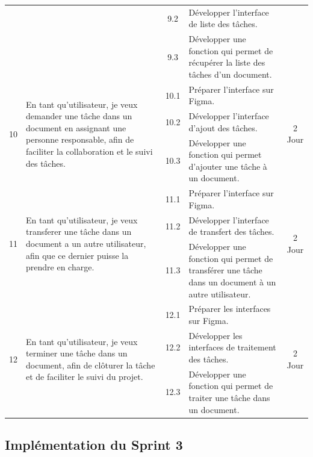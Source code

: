 \begin{adjustwidth}{-1cm}{}
\begin{longtable}{|c|p{6cm}|c|p{6cm}|c|}
      \cline{3-4}
      & & 9.2 & Développer l'interface de liste des tâches. & \\
      \cline{3-4}
      & & 9.3 & Développer une fonction qui permet de récupérer la liste des tâches d'un document. & \\
      \cline{1-5}
      \multirow{3}{*}{10} & \multirow{3}{6cm}{En tant qu'utilisateur, je veux demander une tâche dans un document en assignant une personne responsable, afin de faciliter la collaboration et le suivi des tâches.} & 10.1 & Préparer l'interface sur Figma. & \multirow{3}{*}{2 Jour} \\
      \cline{3-4}
      & & 10.2 & Développer l'interface d'ajout des tâches. & \\
      \cline{3-4}
      & & 10.3 & Développer une fonction qui permet d'ajouter une tâche à un document. & \\
      \cline{1-5}
      \multirow{3}{*}{11} & \multirow{3}{6cm}{En tant qu'utilisateur, je veux transferer une tâche dans un document a un autre utilisateur, afin que ce dernier puisse la prendre en charge.} & 11.1 & Préparer l'interface sur Figma. & \multirow{3}{*}{2 Jour} \\
      \cline{3-4}
      & & 11.2 & Développer l'interface de transfert des tâches. & \\
      \cline{3-4}
      & & 11.3 & Développer une fonction qui permet de transférer une tâche dans un document à un autre utilisateur. & \\
      \cline{1-5}
      \multirow{3}{*}{12} &\multirow{3}{6cm}{En tant qu'utilisateur, je veux terminer une tâche dans un document, afin de clôturer la tâche et de faciliter le suivi du projet.} & 12.1 & Préparer les interfaces sur Figma. & \multirow{3}{*}{2 Jour} \\
      \cline{3-4}
      & & 12.2 & Développer les interfaces de traitement des tâches. & \\
      \cline{3-4}
      & & 12.3 & Développer une fonction qui permet de traiter une tâche dans un document. & \\
      \cline{1-5}
  \hline

\end{longtable}
\end{adjustwidth}



\subsection{Implémentation du Sprint 3}



